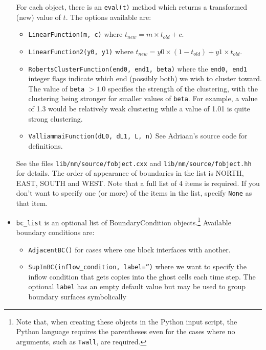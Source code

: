 \begin{itemize}
  For each object, there is an \texttt{eval(t)} method which returns a transformed (new) value of $t$.
  The options available are:
  \begin{itemize}
    \item \texttt{LinearFunction(m, c)}
      where $t_{new} = m \times t_{old} + c$.
    \item \texttt{LinearFunction2(y0, y1)}
      where $t_{new} = y0 \times (1-t_{old}) + y1 \times t_{old}$.
    \item \texttt{RobertsClusterFunction(end0, end1, beta)}
      where the \texttt{end0, end1} integer flags indicate which end (possibly both) we wish to cluster toward.
      The value of \texttt{beta} $> 1.0$ specifies the strength of the clustering, with the clustering
      being stronger for smaller values of \texttt{beta}.
      For example, a value of 1.3 would be relatively weak clustering while a value of 1.01 is quite strong
      clustering.
    \item \texttt{ValliammaiFunction(dL0, dL1, L, n)}
      See Adriaan's source code for definitions.
  \end{itemize}
  See the files \texttt{lib/nm/source/fobject.cxx} and \texttt{lib/nm/source/fobject.hh} for details.
  The order of appearance of boundaries in the list is NORTH, EAST, SOUTH and WEST.
  Note that a full list of 4 items is required.
  If you don't want to specify one (or more) of the items in the list, specify \texttt{None} as that item.
\item \texttt{bc\_list} is an optional list of BoundaryCondition objects.\footnote{Note that, 
  when creating these objects in the Python input script, the Python language requires the parentheses
  even for the cases where no arguments, such as \texttt{Twall}, are required. }
  Available boundary conditions are:
  \begin{itemize}
    \item \texttt{AdjacentBC()} for cases where one block interfaces with another.
    \item \texttt{SupInBC(inflow\_condition, label='')} where we want to specify the inflow condition
      that gets copies into the ghost cells each time step.
      The optional \texttt{label} has an empty default value but may be used to group boundary surfaces symbolically

\end{itemize}
\end{itemize}
